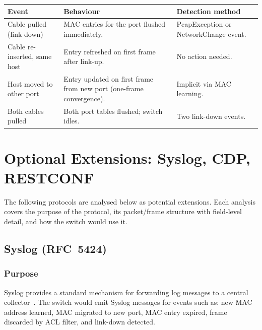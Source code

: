 \documentclass[12pt,a4paper]{article}
\begin{document}
\begin{center}
\begin{tabular}{p{3.4cm}p{5.4cm}p{4.4cm}}
\toprule
\textbf{Event} & \textbf{Behaviour} & \textbf{Detection method} \\
\midrule
Cable pulled (link down) &
  MAC entries for the port flushed immediately. &
  PcapException or NetworkChange event. \\
Cable re-inserted, same host &
  Entry refreshed on first frame after link-up. &
  No action needed. \\
Host moved to other port &
  Entry updated on first frame from new port (one-frame convergence). &
  Implicit via MAC learning. \\
Both cables pulled &
  Both port tables flushed; switch idles. &
  Two link-down events. \\
\bottomrule
\end{tabular}
\end{center}

\section{Optional Extensions: Syslog, CDP, RESTCONF}
\label{sec:extensions}

The following protocols are analysed below as potential extensions.  Each
analysis covers the purpose of the protocol, its packet/frame structure with
field-level detail, and how the switch would use it.

\subsection{Syslog (RFC~5424)}

\subsubsection{Purpose}

Syslog provides a standard mechanism for forwarding log messages to a central
collector~\cite{rfc5424}.  The switch would emit Syslog messages for events
such as: new MAC address learned, MAC migrated to new port, MAC entry expired,
frame discarded by ACL filter, and link-down detected.
\end{document}
